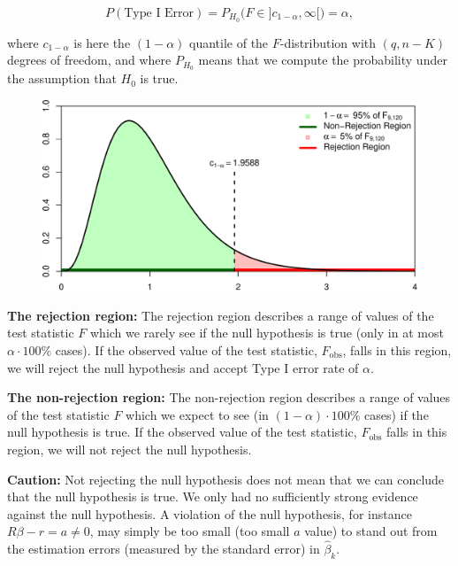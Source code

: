 \documentclass[
  letterpaper,
  DIV=11,
  numbers=noendperiod]{scrreprt}
\theoremstyle{definition}
\theoremstyle{plain}
\theoremstyle{plain}
\theoremstyle{remark}
\begin{document}
\[
P(\text{Type I Error})=P_{H_0}\Big(F\in]c_{1-\alpha},\infty[\Big)=\alpha,
\]

where \(c_{1-\alpha}\) is here the \((1-\alpha)\) quantile of the
\(F\)-distribution with \((q,n-K)\) degrees of freedom, and where
\(P_{H_0}\) means that we compute the probability under the assumption
that \(H_0\) is true.

\begin{figure}

{\centering \includegraphics{./05-Small-Sample-Inference_files/figure-pdf/unnamed-chunk-3-1.pdf}

}

\end{figure}

\textbf{The rejection region:} The rejection region describes a range of
values of the test statistic \(F\) which we rarely see if the null
hypothesis is true (only in at most \(\alpha \cdot 100\%\) cases). If
the observed value of the test statistic, \(F_{\text{obs}}\), falls in
this region, we will reject the null hypothesis and accept Type I error
rate of \(\alpha\).

\textbf{The non-rejection region:} The non-rejection region describes a
range of values of the test statistic \(F\) which we expect to see (in
\((1-\alpha) \cdot 100\%\) cases) if the null hypothesis is true. If the
observed value of the test statistic, \(F_{\text{obs}}\) falls in this
region, we will not reject the null hypothesis.

\textbf{Caution:} Not rejecting the null hypothesis does not mean that
we can conclude that the null hypothesis is true. We only had no
sufficiently strong evidence against the null hypothesis. A violation of
the null hypothesis, for instance \(R\beta -r=a\neq 0\), may simply be
too small (too small \(a\) value) to stand out from the estimation
errors (measured by the standard error) in \(\hat\beta_k.\)
\end{document}

